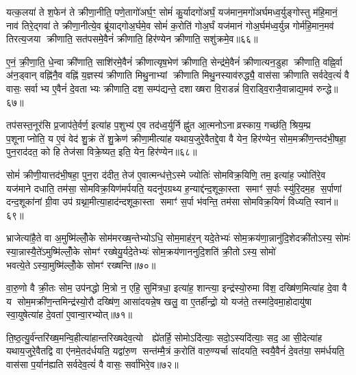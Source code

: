 {\anuvakamend[{इत॑रम्पशु॒मान्थ्स्याद्या॒त्यन॑सो॒थ्सर्ग॑न्तू॒ष्णी स॑र्वदेव॒त्यं॑ वै त्रय॑स्त्रिशच्च॥९॥}]}

यत्क॒लया॑ ते श॒फेन॑ ते क्रीणा॒नीति॒ पणे॒तागो॑अर्घ॒ꣳ॒ सोमं॑ कु॒र्यादगो॑अर्घं॒ यज॑मान॒मगो॑अर्घमध्व॒र्युङ्गोस्तु म॑हि॒मानं॒ नाव॑ तिरे॒द्गवा॑ ते क्रीणा॒नीत्ये॒व ब्रू॑याद्गोअ॒र्घमे॒व सोमं॑ क॒रोति॑ गोअ॒र्घं यज॑मानं गोअ॒र्घम॑ध्व॒र्युन्न गोर्म॑हि॒मान॒मव॑ तिरत्य॒जया क्रीणाति॒ सत॑पसमे॒वैनं॑ क्रीणाति॒ हिर॑ण्येन क्रीणाति॒ सशु॑क्रमे॒व॥६६॥

ए॒नं॒ क्री॒णा॒ति॒ धे॒न्वा क्री॑णाति॒ साशि॑रमे॒वैनं॑ क्रीणात्यृष॒भेण॑ क्रीणाति॒ सेन्द्र॑मे॒वैनं॑ क्रीणात्यन॒डुहा क्रीणाति॒ वह्नि॒र्वा अ॑न॒ड्वान् वह्नि॑नै॒व वह्नि॑ य॒ज्ञस्य॑ क्रीणाति मिथु॒नाभ्यां क्रीणाति मिथु॒नस्याव॑रुद्ध्यै॒ वास॑सा क्रीणाति सर्वदेव॒त्यं॑ वै वासः॒ सर्वाभ्य ए॒वैनं॑ दे॒वताभ्यः क्रीणाति॒ दश॒ सम्प॑द्यन्ते॒ दशाख्षरा वि॒राडन्नं॑ वि॒राड्वि॒राजै॒वान्नाद्य॒मव॑ रुन्द्धे॥६७॥

तप॑सस्त॒नूर॑सि प्र॒जाप॑ते॒र्वर्ण॒ इत्या॑ह प॒शुभ्य॑ ए॒व तद॑ध्व॒र्युर्नि ह्नु॑त आ॒त्मनोऽनाव्रस्काय॒ गच्छ॑ति॒ श्रिय॒म्प्र प॒शूनाप्नोति॒ य ए॒वं वेद॑ शु॒क्रं ते॑ शु॒क्रेण॑ क्रीणा॒मीत्या॑ह यथाय॒जुरे॒वैतद्दे॒वा वै येन॒ हिर॑ण्येन॒ सोम॒मक्री॑ण॒न्तद॑भी॒षहा॒ पुन॒राद॑दत॒ को हि तेज॑सा विक्रे॒ष्यत॒ इति॒ येन॒ हिर॑ण्येन॥६८॥

सोमं॑ क्रीणी॒यात्तद॑भी॒षहा॒ पुन॒रा द॑दीत॒ तेज॑ ए॒वात्मन्ध॑त्ते॒ऽस्मे ज्योतिः॑ सोमविक्र॒यिणि॒ तम॒ इत्या॑ह॒ ज्योति॑रे॒व यज॑माने दधाति॒ तम॑सा॒ सोमविक्र॒यिण॑मर्पयति॒ यदनु॑पग्रथ्य ह॒न्याद्द॑न्द॒शूका॒स्ता समाꣳ॑ स॒र्पाः स्यु॑रि॒दम॒ह स॒र्पाणां दन्द॒शूका॑नां ग्री॒वा उप॑ ग्रथ्ना॒मीत्या॒हाद॑न्दशूका॒स्ता समाꣳ॑ स॒र्पा भ॑वन्ति॒ तम॑सा सोमविक्र॒यिणं॑ विध्यति॒ स्वान॑॥६९॥

भ्राजेत्या॑है॒ते वा अ॒मुष्मि॑ल्लोँ॒के सोम॑मरख्ष॒न्तेभ्योऽधि॒ सोम॒माह॑र॒न् यदे॒तेभ्यः॑ सोम॒क्रय॑णा॒न्नानु॑दि॒शेदक्री॑तोऽस्य॒ सोमः॑ स्या॒न्नास्यै॒ते॑ऽमुष्मि॑ल्लोँ॒के सोमꣳ॑ रख्षेयु॒र्यदे॒तेभ्यः॑ सोम॒क्रय॑णाननुदि॒शति॑ क्री॒तोऽस्य॒ सोमो॑ भवत्ये॒तेऽस्या॒मुष्मि॑ल्लोँ॒के सोमꣳ॑ रख्षन्ति॥७०॥

{\anuvakamend[{सशु॑क्रमे॒व रु॑न्ध॒ इति॒ येन॒ हिर॑ण्येन॒ स्वान॒ चतु॑श्चत्वारिशच्च॥10॥}]}

वा॒रु॒णो वै क्री॒तः सोम॒ उप॑नद्धो मि॒त्रो न॒ एहि॒ सुमि॑त्रधा॒ इत्या॑ह॒ शान्त्या॒ इन्द्र॑स्यो॒रुमा वि॑श॒ दख्षि॑ण॒मित्या॑ह दे॒वा वै य सोम॒मक्री॑ण॒न्तमिन्द्र॑स्यो॒रौ दख्षि॑ण॒ आसा॑दयन्ने॒ष खलु॒ वा ए॒तर्\mbox{}हीन्द्रो॒ यो यज॑ते॒ तस्मा॑दे॒वमा॒होदायु॑षा स्वा॒युषेत्या॑ह दे॒वता॑ ए॒वान्वा॒रभ्योत्॥७१॥

ति॒ष्ठ॒त्यु॒र्व॑न्तरि॑ख्ष॒मन्वि॒हीत्या॑हान्तरिख्षदेव॒त्यो  ह्ये॑तर्\mbox{}हि॒ सोमोऽदि॑त्याः॒ सदो॒ऽस्यदि॑त्याः॒ सद॒ आ सी॒देत्या॑ह यथाय॒जुरे॒वैतद्वि वा ए॑नमे॒तद॑र्धयति॒ यद्वा॑रु॒ण सन्त॑म्मै॒त्रं क॒रोति॑ वारु॒ण्यर्चा सा॑दयति॒ स्वयै॒वैनं॑ दे॒वत॑या॒ सम॑र्धयति॒ वास॑सा प॒र्यान॑ह्यति सर्वदेव॒त्यं॑ वै वासः॒ सर्वा॑भिरे॒व॥७२॥

